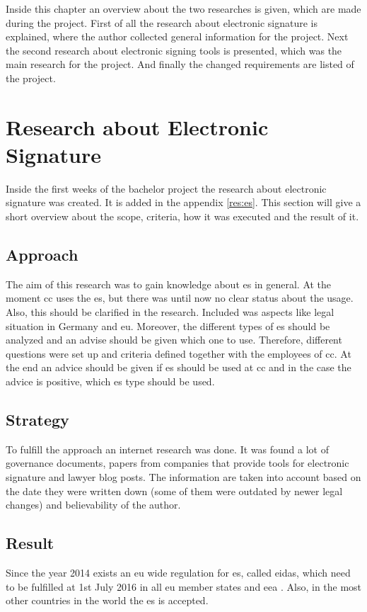 Inside this chapter an overview about the two researches is given, which are made during the project. First of all the research about electronic signature is explained, where the author collected general information for the project. Next the second research about electronic signing tools is presented, which was the main research for the project. And finally the changed requirements are listed of the project.

\section{Research about Electronic Signature}
Inside the first weeks of the bachelor project the research about electronic signature was created. It is added in the appendix \ref{res:es}. This section will give a short overview about the scope, criteria, how it was executed and the result of it.

\subsection{Approach}
The aim of this research was to gain knowledge about \gls{es} in general. At the moment \gls{cc} uses the \gls{es}, but there was until now no clear status about the usage. Also, this should be clarified in the research. Included was aspects like legal situation in Germany and \gls{eu}. Moreover, the different types of \gls{es} should be analyzed and an advise should be given which one to use. Therefore, different questions were set up and criteria defined together with the employees of \gls{cc}. At the end an advice should be given if \gls{es} should be used at \gls{cc} and in the case the advice is positive, which \gls{es} type should be used.

\subsection{Strategy}
To fulfill the approach an internet research was done. It was found a lot of governance documents, papers from companies that provide tools for electronic signature and lawyer blog posts. The information are taken into account based on the date they were written down (some of them were outdated by newer legal changes) and believability of the author.


\subsection{Result}
Since the year 2014 exists an \gls{eu} wide regulation for \gls{es}, called \gls{eidas}, which need to be fulfilled at 1st July 2016 in all \gls{eu} member states and \gls{eea} \parencite{BundesministeriumInneren2018,Steffens2018eIDAS}. Also, in the most other countries in the world the \gls{es} is accepted. 

